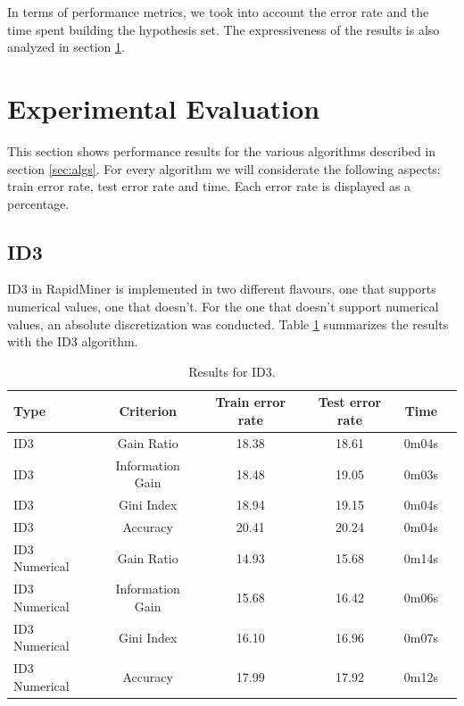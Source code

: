 \documentclass[a4paper]{llncs}
\begin{document}
In terms of performance metrics, we took into account the error rate and the 
time spent building the hypothesis set. The expressiveness of the results is
also analyzed in section \ref{sec:experimental_eval}.

\section{Experimental Evaluation} \label{sec:experimental_eval}

This section shows performance results for the various algorithms described in section \ref{sec:algs}.
For every algorithm we will considerate the following aspects: train error rate, test error rate and time.
Each error rate is displayed as a percentage.

\subsection{ID3}

ID3 in RapidMiner is implemented in two different flavours, one that supports
numerical values, one that doesn't. For the one that doesn't support numerical
values, an absolute discretization was conducted. Table \ref{tbl:results_id3}
summarizes the results with the ID3 algorithm.

\begin{table}
  \begin{center}
  \begin{tabular}{ | l | c | c | c | c | c |}
    \hline
    \textbf{Type} & \textbf{Criterion} & \textbf{Train error rate} & \textbf{Test error rate} & \textbf{Time} \\ \hline
    ID3 & Gain Ratio & 18.38 & 18.61 & 0m04s \\ \hline
    ID3 & Information Gain & 18.48 & 19.05 & 0m03s \\ \hline
    ID3 & Gini Index & 18.94 & 19.15 & 0m04s \\ \hline
    ID3 & Accuracy & 20.41 & 20.24 & 0m04s \\ \hline
    ID3 Numerical & Gain Ratio & 14.93 & 15.68 & 0m14s \\ \hline
    ID3 Numerical & Information Gain & 15.68 & 16.42 & 0m06s \\ \hline
    ID3 Numerical & Gini Index & 16.10 & 16.96 & 0m07s \\ \hline
    ID3 Numerical & Accuracy & 17.99 & 17.92 & 0m12s \\ \hline
  \end{tabular}
  \caption{Results for ID3.}
  \label{tbl:results_id3}
  \end{center}
\end{table}
\end{document}
